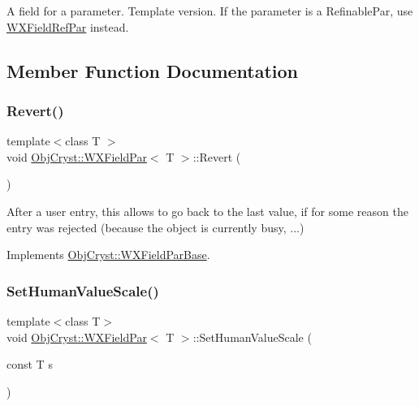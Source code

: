 A field for a parameter. Template version. If the parameter is a Refinable\+Par, use \mbox{\hyperlink{class_obj_cryst_1_1_w_x_field_ref_par}{W\+X\+Field\+Ref\+Par}} instead. 

\subsection{Member Function Documentation}
\mbox{\label{class_obj_cryst_1_1_w_x_field_par_a928b1b8c7d47e3e99a29975c4dd51d58}} 
\subsubsection{\texorpdfstring{Revert()}{Revert()}}
{\footnotesize\ttfamily template$<$class T $>$ \\
void \mbox{\hyperlink{class_obj_cryst_1_1_w_x_field_par}{Obj\+Cryst\+::\+W\+X\+Field\+Par}}$<$ T $>$\+::Revert (\begin{DoxyParamCaption}{ }\end{DoxyParamCaption})\hspace{0.3cm}{\ttfamily [virtual]}}

After a user entry, this allows to go back to the last value, if for some reason the entry was rejected (because the object is currently busy, ...) 

Implements \mbox{\hyperlink{class_obj_cryst_1_1_w_x_field_par_base_a27fd5066d2f6b6e87e213439fd8f7311}{Obj\+Cryst\+::\+W\+X\+Field\+Par\+Base}}.

\mbox{\label{class_obj_cryst_1_1_w_x_field_par_aea7020b96899dfcd41e568f8705fa2f8}} 
\subsubsection{\texorpdfstring{SetHumanValueScale()}{SetHumanValueScale()}}
{\footnotesize\ttfamily template$<$class T$>$ \\
void \mbox{\hyperlink{class_obj_cryst_1_1_w_x_field_par}{Obj\+Cryst\+::\+W\+X\+Field\+Par}}$<$ T $>$\+::Set\+Human\+Value\+Scale (\begin{DoxyParamCaption}\item[{const T}]{s }\end{DoxyParamCaption})}

